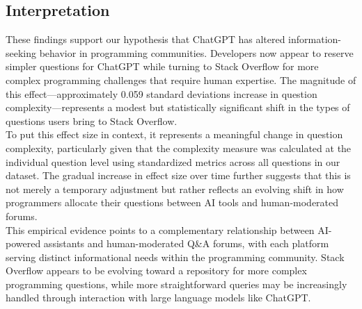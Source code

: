 
\subsection{Interpretation}

These findings support our hypothesis that ChatGPT has altered information-seeking behavior in programming communities. Developers now appear to reserve simpler questions for ChatGPT while turning to Stack Overflow for more complex programming challenges that require human expertise. The magnitude of this effect—approximately 0.059 standard deviations increase in question complexity—represents a modest but statistically significant shift in the types of questions users bring to Stack Overflow.\\

To put this effect size in context, it represents a meaningful change in question complexity, particularly given that the complexity measure was calculated at the individual question level using standardized metrics across all questions in our dataset. The gradual increase in effect size over time further suggests that this is not merely a temporary adjustment but rather reflects an evolving shift in how programmers allocate their questions between AI tools and human-moderated forums.\\

This empirical evidence points to a complementary relationship between AI-powered assistants and human-moderated Q\&A forums, with each platform serving distinct informational needs within the programming community. Stack Overflow appears to be evolving toward a repository for more complex programming questions, while more straightforward queries may be increasingly handled through interaction with large language models like ChatGPT.